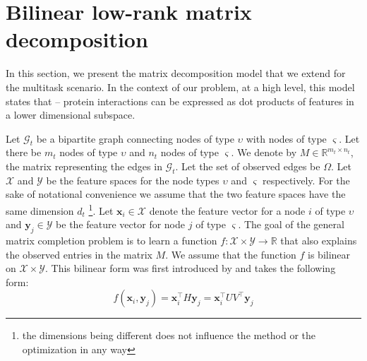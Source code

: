 \documentclass{bioinfo}
\begin{document}


\section{Bilinear low-rank matrix decomposition}
In this section, we present the matrix decomposition model that we extend for the multitask scenario. In the context of our problem, at a high level, this model states that -- protein interactions can be 
expressed as dot products of features in a lower dimensional subspace.

\label{MCintro}
Let $\mathcal{G}_{t}$ be a bipartite graph connecting nodes of type $\upsilon$ with nodes of type $\varsigma$. Let there be $m_t$ nodes of type $\upsilon$ and $n_t$ nodes of type $\varsigma$. We denote by $M \in \mathbb{R}^{m_t \times n_t}$, the matrix representing the edges in $\mathcal{G}_{t}$. Let the set of observed edges be $\Omega$. 
Let $\mathcal{X}$ and $\mathcal{Y}$ be the feature spaces for the node types $\upsilon$ and $\varsigma$ respectively. For the sake of notational convenience we assume that the two feature spaces have the same dimension $d_t$ \footnote{the dimensions being different does not influence the method or the optimization in any way}. Let $\mathbf{x}_i \in \mathcal{X}$ denote the feature vector for a node $i$ of type $\upsilon$ and $\mathbf{y}_j \in \mathcal{Y}$ be the feature vector for node $j$ of type $\varsigma$. The goal of the general matrix completion problem is to learn a function $f : \mathcal{X} \times \mathcal{Y} \rightarrow \mathbb{R}$ that also explains the observed entries in the matrix $M$. We assume that the function $f$ is bilinear on $\mathcal{X} \times \mathcal{Y}$. This bilinear form was first introduced by \cite{abernethy} and takes the following form:
\begin{equation}
f(\mathbf{x}_i, \mathbf{y}_j) = \mathbf{x}_i^\intercal H \mathbf{y}_j = \mathbf{x}_i^\intercal U V^\intercal \mathbf{y}_j
\end{equation}
\end{document}
